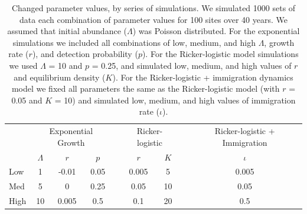 \documentclass[12pt,english]{article}
\begin{document}
\begin{spacing}{1.9}
\begin{flushleft}
\begin{table}[t]
  \centering
\caption{Changed parameter values, by series of simulations.  We
simulated 1000 sets of data each combination of parameter values
for 100 sites over 40 years.  We assumed that initial abundance
($\Lambda$) was Poisson distributed.  For the exponential 
simulations we included all combinations of low, medium, and
high $\Lambda$, growth rate ($r$), and detection probability ($p$).
For the Ricker-logistic model simulations we used $\Lambda$ = 10 and $p$ = 0.25, and
simulated low, medium, and high values of $r$ and equilibrium density ($K$).
For the Ricker-logistic + immigration dynamics model we fixed all parameters the
same as the Ricker-logistic model (with $r$ = 0.05 and $K$ = 10) and
simulated low, medium, and high values of immigration rate ($\iota$).}  
\begin{tabular}{lcccccccc}
    \hline
    & \multicolumn{3}{c}{Exponential Growth} && \multicolumn{2}{c}{Ricker-logistic} &&
    Ricker-logistic + Immigration \\
    \cline{2-4}     \cline{6-7}    \cline{9-9}
& $\Lambda$ & $r$ & $p$ && $r$  & $K$ && $\iota$  \\    
\hline
    Low	        &1	&-0.01	&0.05	&&0.005	 &5	&&0.005  \\
    Med	        &5	&0	&0.25	&&0.05	&10	&&0.05   \\
    High		 &10 &0.005	&0.5	&&0.1	&20	&&0.5    \\
    \hline
  \end{tabular}
\end{table}

\newpage


\end{flushleft}
\end{spacing}
\end{document}
